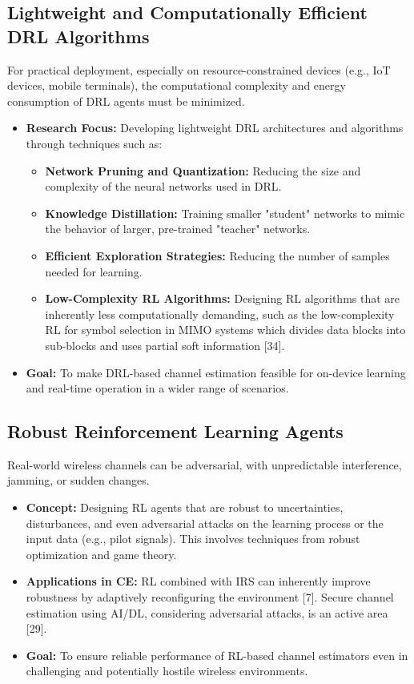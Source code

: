 \documentclass[journal,twocolumn]{IEEEtran}
\begin{document}
\subsection{Lightweight and Computationally Efficient DRL Algorithms}
For practical deployment, especially on resource-constrained devices (e.g., IoT devices, mobile terminals), the computational complexity and energy consumption of DRL agents must be minimized.
\begin{itemize}
    \item \textbf{Research Focus:} Developing lightweight DRL architectures and algorithms through techniques such as:
        \begin{itemize}
            \item \textbf{Network Pruning and Quantization:} Reducing the size and complexity of the neural networks used in DRL.
            \item \textbf{Knowledge Distillation:} Training smaller "student" networks to mimic the behavior of larger, pre-trained "teacher" networks.
            \item \textbf{Efficient Exploration Strategies:} Reducing the number of samples needed for learning.
            \item \textbf{Low-Complexity RL Algorithms:} Designing RL algorithms that are inherently less computationally demanding, such as the low-complexity RL for symbol selection in MIMO systems which divides data blocks into sub-blocks and uses partial soft information [34].
        \end{itemize}
    \item \textbf{Goal:} To make DRL-based channel estimation feasible for on-device learning and real-time operation in a wider range of scenarios.
\end{itemize}

\subsection{Robust Reinforcement Learning Agents}
Real-world wireless channels can be adversarial, with unpredictable interference, jamming, or sudden changes.
\begin{itemize}
    \item \textbf{Concept:} Designing RL agents that are robust to uncertainties, disturbances, and even adversarial attacks on the learning process or the input data (e.g., pilot signals). This involves techniques from robust optimization and game theory.
    \item \textbf{Applications in CE:} RL combined with IRS can inherently improve robustness by adaptively reconfiguring the environment [7]. Secure channel estimation using AI/DL, considering adversarial attacks, is an active area [29].
    \item \textbf{Goal:} To ensure reliable performance of RL-based channel estimators even in challenging and potentially hostile wireless environments.
\end{itemize}
\end{document}
